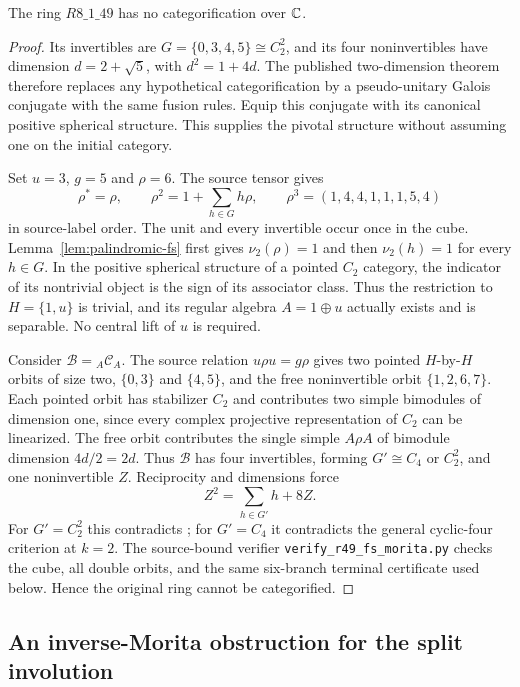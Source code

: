 \begin{proposition}\label{prop:r49-fs-morita}
The ring $R8\_1\_49$ has no categorification over $\mathbb C$.
\end{proposition}
\begin{proof}
Its invertibles are $G=\{0,3,4,5\}\cong C_2^2$, and its four
noninvertibles have dimension $d=2+\sqrt5$, with $d^2=1+4d$.
The published two-dimension theorem
\cite[Lemma~3.1]{SchNear} therefore replaces any hypothetical
categorification by a pseudo-unitary Galois conjugate with the
same fusion rules. Equip this conjugate with its canonical positive
spherical structure. This supplies the pivotal structure without
assuming one on the initial category.

Set $u=3$, $g=5$ and $\rho=6$. The source tensor gives
\[
\rho^*=\rho,\qquad
\rho^2=1+\sum_{h\in G}h\rho,\qquad
\rho^3=(1,4,4,1,1,1,5,4)
\]
in source-label order. The unit and every invertible occur once
in the cube. Lemma~\ref{lem:palindromic-fs} first gives
$\nu_2(\rho)=1$ and then $\nu_2(h)=1$ for every $h\in G$.
In the positive spherical structure of a pointed $C_2$ category,
the indicator of its nontrivial object is the sign of its
associator class. Thus the restriction to $H=\{1,u\}$ is
trivial, and its regular algebra $A=1\oplus u$ actually exists
and is separable. No central lift of $u$ is required.

Consider $\mathcal B={}_A\mathcal C_A$. The source relation
$u\rho u=g\rho$ gives two pointed $H$-by-$H$ orbits of size two,
$\{0,3\}$ and $\{4,5\}$, and the free noninvertible orbit
$\{1,2,6,7\}$. Each pointed orbit has stabilizer $C_2$ and
contributes two simple bimodules of dimension one, since every
complex projective representation of $C_2$ can be linearized.
The free orbit contributes the single simple $A\rho A$ of
bimodule dimension $4d/2=2d$. Thus $\mathcal B$ has four
invertibles, forming $G'\cong C_4$ or $C_2^2$, and one
noninvertible $Z$. Reciprocity and dimensions force
\[
Z^2=\sum_{h\in G'}h+8Z.
\]
For $G'=C_2^2$ this contradicts \cite[Theorem~1.1]{SchNear};
for $G'=C_4$ it contradicts the general cyclic-four criterion
\cite[Theorem~6.3]{R5} at $k=2$. The source-bound verifier
\texttt{verify\_r49\_fs\_morita.py} checks the cube, all double
orbits, and the same six-branch terminal certificate used below.
Hence the original ring cannot be categorified.
\end{proof}

\subsection{An inverse-Morita obstruction for the split involution}

